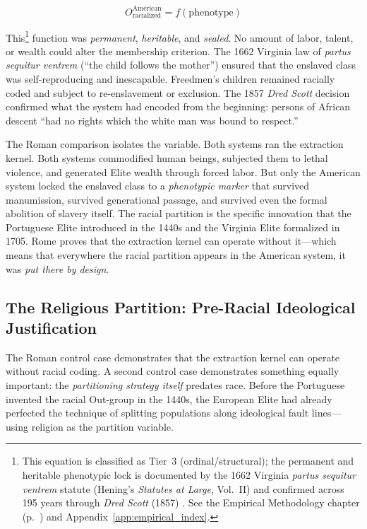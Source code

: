 \begin{equation}\label{eq:2.5-american-racial-function}
O_{\text{racialized}}^{\text{American}} = f(\text{phenotype})
\end{equation}

This\footnote{This equation is classified as Tier~3 (ordinal/structural); the permanent and heritable phenotypic lock is documented by the 1662 Virginia \textit{partus sequitur ventrem} statute (Hening's \textit{Statutes at Large}, Vol.~II) and confirmed across 195 years through \textit{Dred Scott} (1857) \cite{dredscott}. See the Empirical Methodology chapter (p.~\pageref{ch:empirical_methodology}) and Appendix~\ref{app:empirical_index}.} function was \textit{permanent}, \textit{heritable}, and \textit{sealed}. No amount of labor, talent, or wealth could alter the membership criterion. The 1662 Virginia law of \textit{partus sequitur ventrem} (``the child follows the mother'') ensured that the enslaved class was self-reproducing and inescapable. Freedmen's children remained racially coded and subject to re-enslavement or exclusion. The 1857 \textit{Dred Scott} decision confirmed what the system had encoded from the beginning: persons of African descent ``had no rights which the white man was bound to respect.'' \cite{dredscott}

The Roman comparison isolates the variable. Both systems ran the extraction kernel. Both systems commodified human beings, subjected them to lethal violence, and generated Elite wealth through forced labor. But only the American system locked the enslaved class to a \textit{phenotypic marker} that survived manumission, survived generational passage, and survived even the formal abolition of slavery itself. The racial partition is the specific innovation that the Portuguese Elite introduced in the 1440s and the Virginia Elite formalized in 1705. Rome proves that the extraction kernel can operate without it---which means that everywhere the racial partition appears in the American system, it was \textit{put there by design}.

\subsection{The Religious Partition: Pre-Racial Ideological Justification}

The Roman control case demonstrates that the extraction kernel can operate without racial coding. A second control case demonstrates something equally important: the \textit{partitioning strategy itself} predates race. Before the Portuguese invented the racial Out-group in the 1440s, the European Elite had already perfected the technique of splitting populations along ideological fault lines---using religion as the partition variable.

